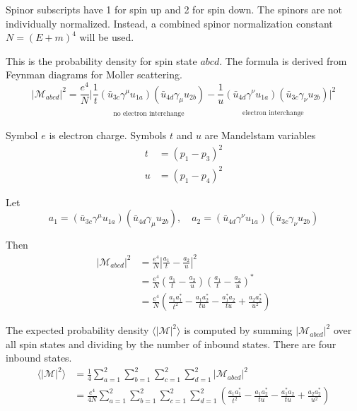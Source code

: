 \documentclass[12pt]{article}
\begin{document}
Spinor subscripts have 1 for spin up and 2 for spin down.
The spinors are not individually normalized.
Instead, a combined spinor normalization constant $N=(E+m)^4$ will be used.

\bigskip
This is the probability density for spin state $abcd$.
The formula is derived from Feynman diagrams for Moller scattering.
\begin{equation*}
|\mathcal{M}_{abcd}|^2=\frac{e^4}{N}
\bigg|
\underset{\substack{\\[1ex]\text{no electron interchange}}}
{\frac{1}{t}(\bar{u}_{3c}\gamma^\mu u_{1a})(\bar{u}_{4d}\gamma_\mu u_{2b})}
-
\underset{\substack{\\[1ex]\text{electron interchange}}}
{\frac{1}{u}(\bar{u}_{4d}\gamma^\nu u_{1a})(\bar{u}_{3c}\gamma_\nu u_{2b})}
\bigg|^2
\end{equation*}

Symbol $e$ is electron charge.
Symbols $t$ and $u$ are Mandelstam variables
\begin{align*}
t&=(p_1-p_3)^2
\\
u&=(p_1-p_4)^2
\end{align*}

Let
\begin{equation*}
a_1=(\bar{u}_{3c}\gamma^\mu u_{1a})(\bar{u}_{4d}\gamma_\mu u_{2b}),
\quad
a_2=(\bar{u}_{4d}\gamma^\nu u_{1a})(\bar{u}_{3c}\gamma_\nu u_{2b})
\end{equation*}

Then
\begin{align*}
|\mathcal{M}_{abcd}|^2
&=
\frac{e^4}{N}
\left|\frac{a_1}{t} - \frac{a_2}{u}\right|^2\\
&=
\frac{e^4}{N}
\left(\frac{a_1}{t} - \frac{a_2}{u}\right)\left(\frac{a_1}{t} - \frac{a_2}{u}\right)^*\\
&=
\frac{e^4}{N}
\left(
\frac{a_1a_1^*}{t^2} - \frac{a_1a_2^*}{tu} -
\frac{a_1^*a_2}{tu} + \frac{a_2a_2^*}{u^2}
\right)
\end{align*}

The expected probability density $\langle|\mathcal{M}|^2\rangle$ is computed by
summing $|\mathcal{M}_{abcd}|^2$ over all spin states and dividing by the number
of inbound states.
There are four inbound states.
\begin{align*}
\langle|\mathcal{M}|^2\rangle
&=
\frac{1}{4}\sum_{a=1}^2\sum_{b=1}^2\sum_{c=1}^2\sum_{d=1}^2
|\mathcal{M}_{abcd}|^2\\
&=
\frac{e^4}{4N}\sum_{a=1}^2\sum_{b=1}^2\sum_{c=1}^2\sum_{d=1}^2
\left(
\frac{a_1a_1^*}{t^2}-\frac{a_1a_2^*}{tu}-\frac{a_1^*a_2}{tu}+\frac{a_2a_2^*}{u^2}
\right)
\end{align*}
\end{document}

